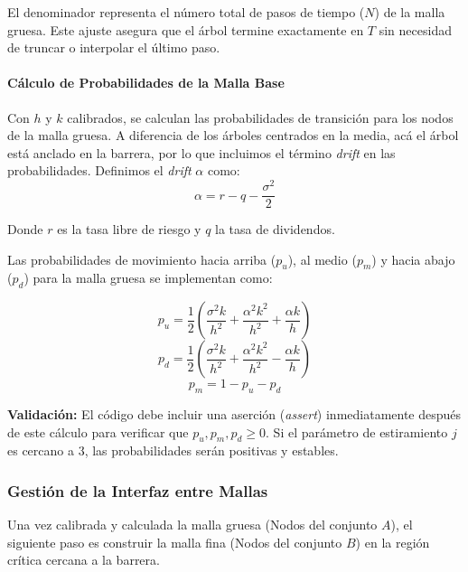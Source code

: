 El denominador representa el número total de pasos de tiempo ($N$) de la malla gruesa. Este ajuste asegura que el árbol termine exactamente en $T$ sin necesidad de truncar o interpolar el último paso.

\paragraph{Cálculo de Probabilidades de la Malla Base} 

Con $h$ y $k$ calibrados, se calculan las probabilidades de transición para los nodos de la malla gruesa. A diferencia de los árboles centrados en la media, acá el árbol está anclado en la barrera, por lo que incluimos el término \textit{drift} en las probabilidades.
Definimos el \textit{drift} $\alpha$ como: 
\begin{equation} 
  \alpha = r - q - \frac{\sigma^2}{2} 
\end{equation} 

Donde $r$ es la tasa libre de riesgo y $q$ la tasa de dividendos.

Las probabilidades de movimiento hacia arriba ($p_u$), al medio ($p_m$) y hacia abajo ($p_d$) para la malla gruesa se implementan como:

\begin{equation} 
  p_u = \frac{1}{2} \left( \frac{\sigma^2 k}{h^2} + \frac{\alpha^2 k^2}{h^2} + \frac{\alpha k}{h} \right) 
\end{equation}
\begin{equation} 
  p_d = \frac{1}{2} \left( \frac{\sigma^2 k}{h^2} + \frac{\alpha^2 k^2}{h^2} - \frac{\alpha k}{h} \right) 
\end{equation}
\begin{equation} 
  p_m = 1 - p_u - p_d 
\end{equation}

\textbf{Validación:} El código debe incluir una aserción (\textit{assert}) inmediatamente después de este cálculo para verificar que $p_u,p_m,p_d\ge0$. Si el parámetro de estiramiento $j$ es cercano a $3$, las probabilidades serán positivas y estables.

\subsubsection{Gestión de la Interfaz entre Mallas}

Una vez calibrada y calculada la malla gruesa (Nodos del conjunto $A$), el siguiente paso es construir la malla fina (Nodos del conjunto $B$) en la región crítica cercana a la barrera.

